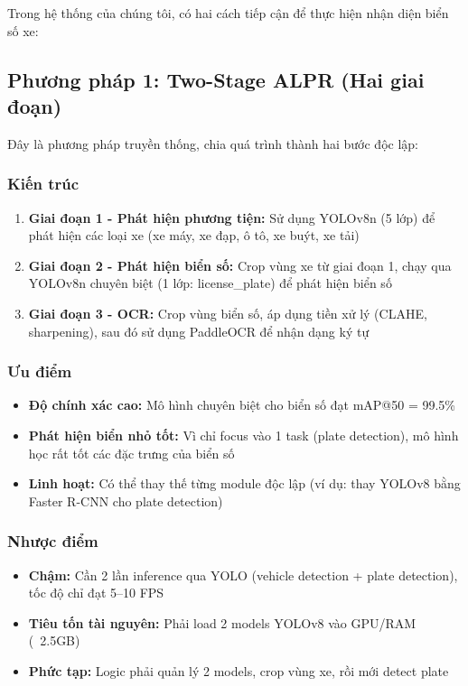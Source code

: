 Trong hệ thống của chúng tôi, có hai cách tiếp cận để thực hiện nhận diện biển số xe:

\subsection{Phương pháp 1: Two-Stage ALPR (Hai giai đoạn)}

Đây là phương pháp truyền thống, chia quá trình thành hai bước độc lập:

\subsubsection{Kiến trúc}
\begin{enumerate}
    \item \textbf{Giai đoạn 1 - Phát hiện phương tiện:} Sử dụng YOLOv8n (5 lớp) để phát hiện các loại xe (xe máy, xe đạp, ô tô, xe buýt, xe tải)
    \item \textbf{Giai đoạn 2 - Phát hiện biển số:} Crop vùng xe từ giai đoạn 1, chạy qua YOLOv8n chuyên biệt (1 lớp: license\_plate) để phát hiện biển số
    \item \textbf{Giai đoạn 3 - OCR:} Crop vùng biển số, áp dụng tiền xử lý (CLAHE, sharpening), sau đó sử dụng PaddleOCR để nhận dạng ký tự
\end{enumerate}

\subsubsection{Ưu điểm}
\begin{itemize}
    \item \textbf{Độ chính xác cao:} Mô hình chuyên biệt cho biển số đạt mAP@50 = 99.5\%
    \item \textbf{Phát hiện biển nhỏ tốt:} Vì chỉ focus vào 1 task (plate detection), mô hình học rất tốt các đặc trưng của biển số
    \item \textbf{Linh hoạt:} Có thể thay thế từng module độc lập (ví dụ: thay YOLOv8 bằng Faster R-CNN cho plate detection)
\end{itemize}

\subsubsection{Nhược điểm}
\begin{itemize}
    \item \textbf{Chậm:} Cần 2 lần inference qua YOLO (vehicle detection + plate detection), tốc độ chỉ đạt 5--10 FPS
    \item \textbf{Tiêu tốn tài nguyên:} Phải load 2 models YOLOv8 vào GPU/RAM (~2.5GB)
    \item \textbf{Phức tạp:} Logic phải quản lý 2 models, crop vùng xe, rồi mới detect plate
\end{itemize}


